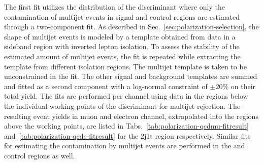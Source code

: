The first fit utilizes the distribution of the \bdtqcd discriminant where only the contamination of multijet events in signal and control regions are estimated through a two-component fit. As described in Sec.~\ref{sec:polarization-selection}, the shape of multijet events is modeled by a template obtained from data in a sideband region with inverted lepton isolation. To assess the stability of the estimated amount of multijet events, the fit is repeated while extracting the template from different isolation regions. The multijet template is taken to be unconstrained in the fit. The other signal and background templates are summed and fitted as a second component with a log-normal constraint of $\pm20\%$ on their total yield. The fits are performed per channel using data in the regions below the individual working points of the \bdtqcd discriminant for multijet rejection. The resulting event yields in muon and electron channel, extrapolated into the regions above the working points, are listed in Tabs.~\ref{tab:polarization-qcdmu-fitresult} and~\ref{tab:polarization-qcde-fitresult} for the 2j1t region respectively. Similar fits for estimating the contamination by multijet events are performed in the \wjets and \ttbar control regions as well.


